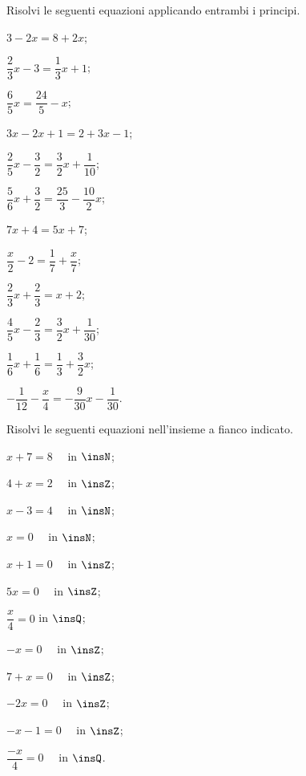 \begin{esercizio}[\Ast]
\label{ese:15.7}
Risolvi le seguenti equazioni applicando entrambi i principi.
\begin{multicols}{3}
\begin{enumeratea}
 \item $3-2x=8+2x$;
 \item $\dfrac{2}{3}x-3=\dfrac{1}{3}x+1$;
 \item $\dfrac{6}{5}x=\dfrac{24}{5}-x$;
 \item $3x-2x+1=2+3x-1$;
 \item $\dfrac{2}{5}x-\dfrac{3}{2}=\dfrac{3}{2}x+\dfrac{1}{10}$;
 \item $\dfrac{5}{6}x+\dfrac{3}{2}=\dfrac{25}{3}-\dfrac{10}{2}x$;
 \item $7x+4=5x+7$;
 \item $\dfrac{x}{2}-2=\dfrac{1}{7}+\dfrac{x}{7}$;
 \item $\dfrac{2}{3}x+\dfrac{2}{3}=x+2$;
 \item $\dfrac{4}{5}x-\dfrac{2}{3}=\dfrac{3}{2}x+\dfrac{1}{30}$;
 \item $\dfrac{1}{6}x+\dfrac{1}{6}=\dfrac{1}{3}+\dfrac{3}{2}x$;
 \item $-\dfrac{1}{12}-\dfrac{x}{4}=-\dfrac{9}{30}x-\dfrac{1}{30}$.
\end{enumeratea}
\end{multicols}
\end{esercizio}

\begin{esercizio}[\Ast]
\label{ese:15.8}
Risolvi le seguenti equazioni nell'insieme a fianco indicato.
\begin{multicols}{3}
\begin{enumeratea}
 \item $x+7=8\quad$ in $\insN$;
 \item $4+x=2\quad$ in $\insZ$;
 \item $x-3=4\quad$ in $\insN$;
 \item $x=0\quad$ in $\insN$;
 \item $x+1=0\quad$ in $\insZ$;
 \item $5x=0\quad$ in $\insZ$;
 \item $\dfrac{x}{4}=0$ in $\insQ$;
 \item $-x=0\quad$ in $\insZ$;
 \item $7+x=0\quad$ in $\insZ$;
 \item $-2x=0\quad$ in $\insZ$;
 \item $-x-1=0\quad$ in $\insZ$;
 \item $\dfrac{-x}{4}=0\quad$ in $\insQ$.
\end{enumeratea}
\end{multicols}
\end{esercizio}

